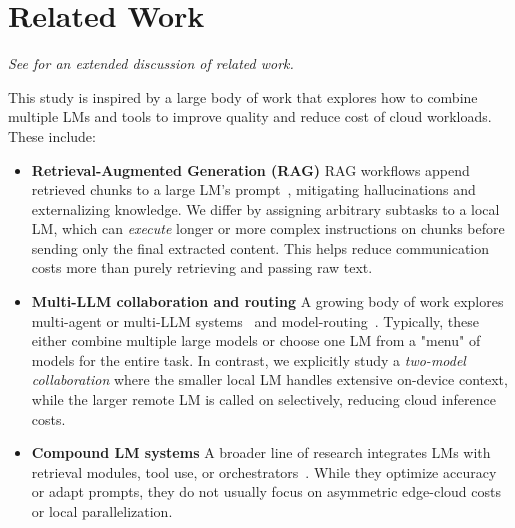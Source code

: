 \vspace{-1em}
\section{Related Work}

\label{sec:related-work}

\textit{See  for an extended discussion of related work.}

This study is inspired by a large body of work that explores how to combine multiple LMs and tools to improve quality and reduce cost of cloud workloads.
These include:

\setlength{\leftmargini}{12pt} %
\begin{itemize}

\item \textbf{Retrieval-Augmented Generation (RAG)} RAG workflows append retrieved chunks to a large LM's prompt~\citep{lewis2020retrieval,karpukhin2020dense, lee2019latent}, mitigating hallucinations and externalizing knowledge. We differ by assigning arbitrary subtasks to a local LM, which can \emph{execute} longer or more complex instructions on chunks before sending only the final extracted content. This helps reduce communication costs more than purely retrieving and passing raw text.

\item \textbf{Multi-LLM collaboration and routing} A growing body of work explores multi-agent or multi-LLM systems~\citep{guo2024large, wang2024mixture} and model-routing~\citep{chen2023frugalgpt, chen2024more}. Typically, these either combine multiple large models or choose one LM from a "menu" of models for the entire task. In contrast, we explicitly study a \emph{two-model collaboration} where the smaller local LM handles extensive on-device context, while the larger remote LM is called on selectively, reducing cloud inference costs.

\item \textbf{Compound LM systems} A broader line of research integrates LMs with retrieval modules, tool use, or orchestrators~\citep{saad2024archon, khattab2023dspy}. While they optimize accuracy or adapt prompts, they do not usually focus on asymmetric edge-cloud costs or local parallelization.

\end{itemize}

